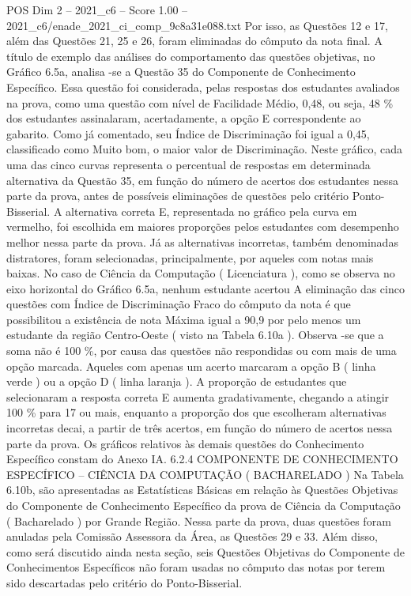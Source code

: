 \begin{textsample}{POS Dim 2 – 2021\_c6 – Score 1.00 – 2021\_c6/enade\_2021\_ci\_comp\_9c8a31e088.txt}
Por isso, as Questões 12 e 17, além das Questões 21, 25 e 26, foram eliminadas do cômputo da nota final.
A título de exemplo das análises do comportamento das questões objetivas, no Gráfico 6.5a, analisa -se a Questão 35 do Componente de Conhecimento Específico.
Essa questão foi considerada, pelas respostas dos estudantes avaliados na prova, como uma questão com nível de Facilidade Médio, 0,48, ou seja, 48 \% dos estudantes assinalaram, acertadamente, a opção E correspondente ao gabarito.
Como já comentado, seu Índice de Discriminação foi igual a 0,45, classificado como Muito bom, o maior valor de Discriminação.
Neste gráfico, cada uma das cinco curvas representa o percentual de respostas em determinada alternativa da Questão 35, em função do número de acertos dos estudantes nessa parte da prova, antes de possíveis eliminações de questões pelo critério Ponto-Bisserial.
A alternativa correta E, representada no gráfico pela curva em vermelho, foi escolhida em maiores proporções pelos estudantes com desempenho melhor nessa parte da prova.
Já as alternativas incorretas, também denominadas distratores, foram selecionadas, principalmente, por aqueles com notas mais baixas.
No caso de Ciência da Computação ( Licenciatura ), como se observa no eixo horizontal do Gráfico 6.5a, nenhum estudante acertou A eliminação das cinco questões com Índice de Discriminação Fraco do cômputo da nota é que possibilitou a existência de nota Máxima igual a 90,9 por pelo menos um estudante da região Centro-Oeste ( visto na Tabela 6.10a ).
Observa -se que a soma não é 100 \%, por causa das questões não respondidas ou com mais de uma opção marcada.
Aqueles com apenas um acerto marcaram a opção B ( linha verde ) ou a opção D ( linha laranja ).
A proporção de estudantes que selecionaram a resposta correta E aumenta gradativamente, chegando a atingir 100 \% para 17 ou mais, enquanto a proporção dos que escolheram alternativas incorretas decai, a partir de três acertos, em função do número de acertos nessa parte da prova.
Os gráficos relativos às demais questões do Conhecimento Específico constam do Anexo IA. 6.2.4 COMPONENTE DE CONHECIMENTO ESPECÍFICO – CIÊNCIA DA COMPUTAÇÃO ( BACHARELADO ) Na Tabela 6.10b, são apresentadas as Estatísticas Básicas em relação às Questões Objetivas do Componente de Conhecimento Específico da prova de Ciência da Computação ( Bacharelado ) por Grande Região.
Nessa parte da prova, duas questões foram anuladas pela Comissão Assessora da Área, as Questões 29 e 33.
Além disso, como será discutido ainda nesta seção, seis Questões Objetivas do Componente de Conhecimentos Específicos não foram usadas no cômputo das notas por terem sido descartadas pelo critério do Ponto-Bisserial.

\end{textsample}
